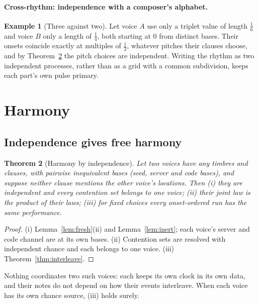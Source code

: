 \documentclass[11pt,a4paper]{article}
\theoremstyle{plain}
\newtheorem{theorem}{Theorem}[section]
\theoremstyle{definition}
\newtheorem{example}[theorem]{Example}
\theoremstyle{remark}
\begin{document}
\paragraph{Cross-rhythm: independence with a composer's alphabet.}

\begin{example}[Three against two]\label{ex:crossrhythm}
Let voice $A$ use only a triplet value of length $\tfrac{1}{6}$ and voice $B$
only a length of $\tfrac14$, both starting at $0$ from distinct bases. Their
onsets coincide exactly at multiples of $\tfrac12$, whatever pitches their
clauses choose, and by Theorem~\ref{thm:harmony} the pitch choices are
independent. Writing the rhythm as two independent processes, rather than as a
grid with a common subdivision, keeps each part's own pulse primary.
\end{example}

\section{Harmony}\label{sec:harmony}

\subsection{Independence gives free harmony}

\begin{theorem}[Harmony by independence]\label{thm:harmony}
Let two voices have any timbres and clauses, with pairwise inequivalent bases
(seed, server and code bases), and suppose neither clause mentions the other voice's
locations. Then (i) they are independent and every contention set belongs to
one voice; (ii) their joint law is the product of their laws; (iii) for fixed
choices every onset-ordered run has the same performance.
\end{theorem}
\begin{proof}
(i) Lemma~\ref{lem:fresh}(ii) and Lemma~\ref{lem:inert}; each voice's server
and code channel are at its own bases. (ii) Contention sets
are resolved with independent chance and each belongs to one voice. (iii)
Theorem~\ref{thm:interleave}.
\end{proof}

Nothing coordinates two such voices: each keeps its own clock in its own data,
and their notes do not depend on how their events interleave. When each voice
has its own chance source, (iii) holds surely.
\end{document}
